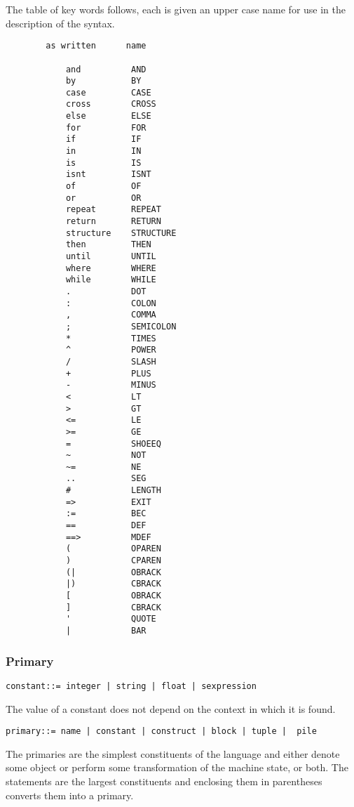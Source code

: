 \documentclass{article}
\begin{document}
The table of key words follows, each is given an upper case
name for use in the description of the syntax.
\begin{verbatim}
        as written      name

            and          AND
            by           BY
            case         CASE
            cross        CROSS
            else         ELSE
            for          FOR
            if           IF
            in           IN
            is           IS
            isnt         ISNT
            of           OF
            or           OR
            repeat       REPEAT
            return       RETURN
            structure    STRUCTURE
            then         THEN
            until        UNTIL
            where        WHERE
            while        WHILE
            .            DOT
            :            COLON
            ,            COMMA
            ;            SEMICOLON
            *            TIMES
            ^            POWER
            /            SLASH
            +            PLUS
            -            MINUS
            <            LT
            >            GT
            <=           LE
            >=           GE
            =            SHOEEQ
            ~            NOT
            ~=           NE
            ..           SEG
            #            LENGTH
            =>           EXIT
            :=           BEC
            ==           DEF
            ==>          MDEF
            (            OPAREN
            )            CPAREN
            (|           OBRACK
            |)           CBRACK
            [            OBRACK
            ]            CBRACK
            '            QUOTE
            |            BAR
\end{verbatim}

\subsubsection{Primary}
\label{sec:boot:primar-expr}

\begin{verbatim}
constant::= integer | string | float | sexpression
\end{verbatim}

The value of a constant does not depend on the context in which it
is found.
\begin{verbatim}
primary::= name | constant | construct | block | tuple |  pile
\end{verbatim}

The primaries are the simplest constituents of the language and
either denote some object or perform some transformation of the
machine state, or both.
The statements are the largest constituents and enclosing them
in parentheses converts them into a primary.
\end{document}
